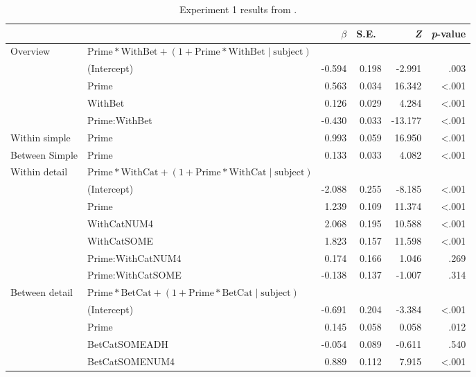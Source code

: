 \documentclass[10pt]{article}
\begin{document}
\begin{multicols}{2}
\begin{table}[ht]
  \caption{Experiment 1 results from \textcite[125]{Bott:2016aa}.}\vspace{-20pt}
  \begin{center}
    \begin{tabular}{llrrrr}
      \hline
      & & \(\beta\) & S.E.\ & \emph{Z} & \emph{p}-value  \\
      \hline
      Overview & \(\text{Prime} * \text{WithBet} + (1 + \text{Prime} * \text{WithBet} \mid \text{subject})\) & & & \\
      & (Intercept) & -0.594 & 0.198 & -2.991 & .003 \\
      & Prime & 0.563 & 0.034 & 16.342 & <.001 \\
      & WithBet & 0.126 & 0.029 & 4.284 & <.001 \\
      & Prime:WithBet & -0.430 & 0.033 & -13.177 & <.001 \\
      Within simple & Prime & 0.993 & 0.059 & 16.950 & <.001 \\
      Between Simple & Prime & 0.133 & 0.033 & 4.082 & <.001 \\
      Within detail & \multicolumn{2}{l}{\(\text{Prime} * \text{WithCat} + (1 + \text{Prime} * \text{WithCat} \mid \text{subject})\)}  & & & \\
      & (Intercept)  & -2.088 & 0.255 & -8.185 & <.001\\
      & Prime & 1.239 & 0.109 & 11.374 & <.001 \\
      & WithCatNUM4 & 2.068 & 0.195 & 10.588 & <.001 \\
      & WithCatSOME & 1.823 & 0.157 & 11.598 & <.001 \\
      & Prime:WithCatNUM4 & 0.174 & 0.166 & 1.046 & .269 \\
      & Prime:WithCatSOME & -0.138 & 0.137 & -1.007 & .314 \\
      Between detail & \multicolumn{2}{l}{\(\text{Prime} * \text{BetCat} + (1 + \text{Prime} * \text{BetCat} \mid \text{subject})\)}  & & & \\
      & (Intercept)  & -0.691 & 0.204 & -3.384 & <.001\\
      & Prime & 0.145 & 0.058 & 0.058 & .012 \\
      & BetCatSOMEADH & -0.054 & 0.089 & -0.611 & .540 \\
      & BetCatSOMENUM4 & 0.889 & 0.112 & 7.915 & <.001 \\

\end{tabular}
\end{center}
\end{table}
\end{multicols}
\end{document}
